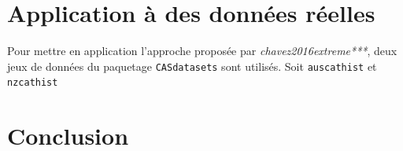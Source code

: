 \documentclass[11pt]{report}
\numberwithin{equation}{section}
\begin{document}
\chapter{Application à des données réelles}
\label{chap:application} 

Pour mettre en application l'approche proposée par \textit{chavez2016extreme***}, deux jeux de données du paquetage \texttt{CASdatasets} sont utilisés. Soit \texttt{auscathist} et \texttt{nzcathist}


\chapter*{Conclusion}
\label{chap:conclusion} 




% 
\end{document}
